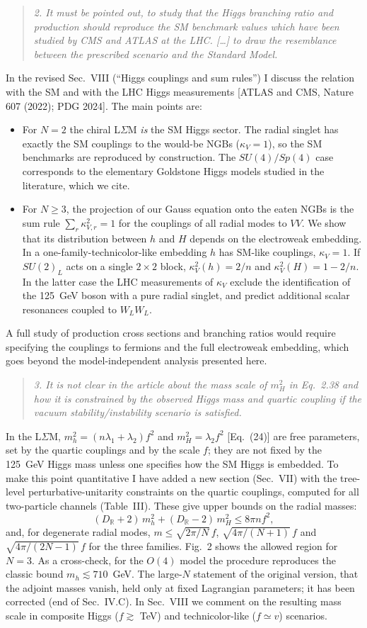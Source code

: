 \documentclass[11pt,a4paper]{article}
\newcommand{\referee}[1]{\begin{quote}\itshape\color{black!70}#1\end{quote}}
\begin{document}
\referee{2. It must be pointed out, to study that the Higgs branching ratio and production should reproduce the SM benchmark values which have been studied by CMS and ATLAS at the LHC. [\dots] to draw the resemblance between the prescribed scenario and the Standard Model.}

In the revised Sec.~VIII (``Higgs couplings and sum rules'') I discuss the relation with the SM and with the LHC Higgs measurements [ATLAS and CMS, Nature 607 (2022); PDG 2024]. The main points are:
\begin{itemize}[leftmargin=*]
\item For $N=2$ the chiral L$\Sigma$M \emph{is} the SM Higgs sector. The radial singlet has exactly the SM couplings to the would-be NGBs ($\kappa_V=1$), so the SM benchmarks are reproduced by construction. The $SU(4)/Sp(4)$ case corresponds to the elementary Goldstone Higgs models studied in the literature, which we cite.
\item For $N\ge3$, the projection of our Gauss equation onto the eaten NGBs is the sum rule $\sum_r\kappa_{V,r}^2=1$ for the couplings of all radial modes to $VV$. We show that its distribution between $h$ and $H$ depends on the electroweak embedding. In a one-family-technicolor-like embedding $h$ has SM-like couplings, $\kappa_V=1$. If $SU(2)_L$ acts on a single $2\times2$ block, $\kappa_V^2(h)=2/n$ and $\kappa_V^2(H)=1-2/n$. In the latter case the LHC measurements of $\kappa_V$ exclude the identification of the 125~GeV boson with a pure radial singlet, and predict additional scalar resonances coupled to $W_LW_L$.
\end{itemize}
A full study of production cross sections and branching ratios would require specifying the couplings to fermions and the full electroweak embedding, which goes beyond the model-independent analysis presented here.

\referee{3. It is not clear in the article about the mass scale of $m_H^2$ in Eq.~2.38 and how it is constrained by the observed Higgs mass and quartic coupling if the vacuum stability/instability scenario is satisfied.}

In the L$\Sigma$M, $m_h^2=(n\lambda_1+\lambda_2)f^2$ and $m_H^2=\lambda_2f^2$ [Eq.~(24)] are free parameters, set by the quartic couplings and by the scale $f$; they are not fixed by the 125~GeV Higgs mass unless one specifies how the SM Higgs is embedded. To make this point quantitative I have added a new section (Sec.~VII) with the tree-level perturbative-unitarity constraints on the quartic couplings, computed for all two-particle channels (Table~III). These give upper bounds on the radial masses:
\[
(D_{\mathbb R}+2)\,m_h^2+(D_{\mathbb R}-2)\,m_H^2\le8\pi n f^2 ,
\]
and, for degenerate radial modes, $m\le\sqrt{2\pi/N}\,f$, $\sqrt{4\pi/(N+1)}\,f$ and $\sqrt{4\pi/(2N-1)}\,f$ for the three families. Fig.~2 shows the allowed region for $N=3$. As a cross-check, for the $O(4)$ model the procedure reproduces the classic bound $m_h\lesssim710$~GeV. The large-$N$ statement of the original version, that the adjoint masses vanish, held only at fixed Lagrangian parameters; it has been corrected (end of Sec.~IV.C). In Sec.~VIII we comment on the resulting mass scale in composite Higgs ($f\gtrsim$ TeV) and technicolor-like ($f\simeq v$) scenarios.
\end{document}
